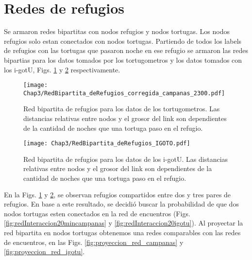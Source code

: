 \section{Redes  de refugios}
Se armaron redes bipartitas con nodos refugios y nodos tortugas. Los nodos refugios solo estan conectados con nodos tortugas.  Partiendo de todos los labels de refugios con las tortugas que pasaron noche en ese refugio se armaron las redes bipartias para los datos tomados por los tortugometros y los datos tomados con los i-gotU, Figs. \ref{fig:red_bipartita_refus_campanas} y \ref{fig:red_bipartita_refus_igotu} respectivamente.

\begin{figure}[ht]
    \begin{center}
        \texttt{[image: Chap3/RedBipartita\_deRefugios\_corregida\_campanas\_2300.pdf]}
        \caption[Red bipartita de refugios para los datos de los tortugometros.]{Red bipartita de refugios para los datos de los tortugometros. Las distancias relativas entre nodos y el grosor del link son dependientes de la cantidad de noches que una  tortuga paso en el refugio. } 
        \label{fig:red_bipartita_refus_campanas}
        
        \end{center}
\end{figure} 

\begin{figure}[ht]
    \begin{center}
        \texttt{[image: Chap3/RedBipartita\_deRefugios\_IGOTO.pdf]}
        \caption[Red bipartita de refugios para los datos de los i-gotU.]{Red bipartita de refugios para los datos de los i-gotU. Las distancias relativas entre nodos y el grosor del link son dependientes de la cantidad de noches que una  tortuga paso en el refugio. } 
        \label{fig:red_bipartita_refus_igotu}
        
        \end{center}
\end{figure} 
En la Figs. \ref{fig:red_bipartita_refus_campanas} y \ref{fig:red_bipartita_refus_igotu}, se observan refugios compartidos entre dos y tres pares de refugios.  En base a este resultado, se decidió buscar la probabilidad de que dos nodos tortugas esten conectados en la red de encuentros (Figs. \ref{fig:redInteraccion20mincampanas} y \ref{fig:redInteraccion20igotu}). Al proyectar la red bipartita en nodos tortugas obtenemos una redes comparables con las redes de encuentros, en las Figs. \ref{fig:proyeccion_red_campanas} y \ref{fig:proyeccion_red_igotu}.


